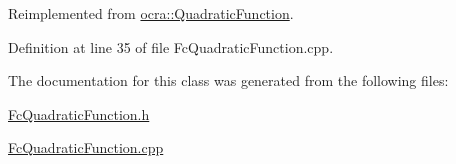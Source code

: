 Reimplemented from \hyperlink{classocra_1_1QuadraticFunction_aeaa560b1771f4024755753236fd69779}{ocra\+::\+Quadratic\+Function}.



Definition at line 35 of file Fc\+Quadratic\+Function.\+cpp.



The documentation for this class was generated from the following files\+:\begin{DoxyCompactItemize}
\item 
\hyperlink{FcQuadraticFunction_8h}{Fc\+Quadratic\+Function.\+h}\item 
\hyperlink{FcQuadraticFunction_8cpp}{Fc\+Quadratic\+Function.\+cpp}\end{DoxyCompactItemize}
